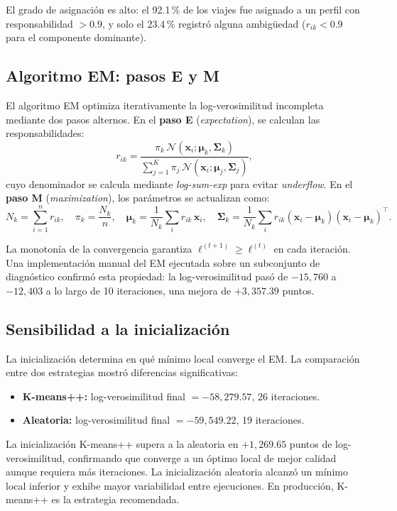 \documentclass[12pt, a4paper]{article}
\begin{document}
El grado de asignación es alto: el 92{.}1\,\% de los viajes fue asignado a un perfil con responsabilidad $> 0{.}9$, y solo el 23{.}4\,\% registró alguna ambigüedad ($r_{ik} < 0{.}9$ para el componente dominante).

\subsection{Algoritmo EM: pasos E y M}

El algoritmo EM optimiza iterativamente la log-verosimilitud incompleta mediante dos pasos alternos. En el \textbf{paso E} (\emph{expectation}), se calculan las responsabilidades:
\[
  r_{ik} = \frac{\pi_k\,\mathcal{N}(\mathbf{x}_i;\boldsymbol{\mu}_k,\boldsymbol{\Sigma}_k)}
                {\sum_{j=1}^{K}\pi_j\,\mathcal{N}(\mathbf{x}_i;\boldsymbol{\mu}_j,\boldsymbol{\Sigma}_j)},
\]
cuyo denominador se calcula mediante \emph{log-sum-exp} para evitar \emph{underflow}. En el \textbf{paso M} (\emph{maximization}), los parámetros se actualizan como:
\[
  N_k = \sum_{i=1}^{n} r_{ik}, \quad
  \pi_k = \frac{N_k}{n}, \quad
  \boldsymbol{\mu}_k = \frac{1}{N_k}\sum_i r_{ik}\,\mathbf{x}_i, \quad
  \boldsymbol{\Sigma}_k = \frac{1}{N_k}\sum_i r_{ik}(\mathbf{x}_i - \boldsymbol{\mu}_k)(\mathbf{x}_i - \boldsymbol{\mu}_k)^\top.
\]

La monotonía de la convergencia garantiza $\ell^{(t+1)} \geq \ell^{(t)}$ en cada iteración. Una implementación manual del EM ejecutada sobre un subconjunto de diagnóstico confirmó esta propiedad: la log-verosimilitud pasó de $-15{,}760$ a $-12{,}403$ a lo largo de 10 iteraciones, una mejora de $+3{,}357{.}39$ puntos.

\subsection{Sensibilidad a la inicialización}

La inicialización determina en qué mínimo local converge el EM. La comparación entre dos estrategias mostró diferencias significativas:

\begin{itemize}[leftmargin=1.5cm]
  \item \textbf{K-means++:} log-verosimilitud final $= -58{,}279{.}57$, 26 iteraciones.
  \item \textbf{Aleatoria:} log-verosimilitud final $= -59{,}549{.}22$, 19 iteraciones.
\end{itemize}

La inicialización K-means++ supera a la aleatoria en $+1{,}269{.}65$ puntos de log-verosimilitud, confirmando que converge a un óptimo local de mejor calidad aunque requiera más iteraciones. La inicialización aleatoria alcanzó un mínimo local inferior y exhibe mayor variabilidad entre ejecuciones. En producción, K-means++ es la estrategia recomendada.
\end{document}
